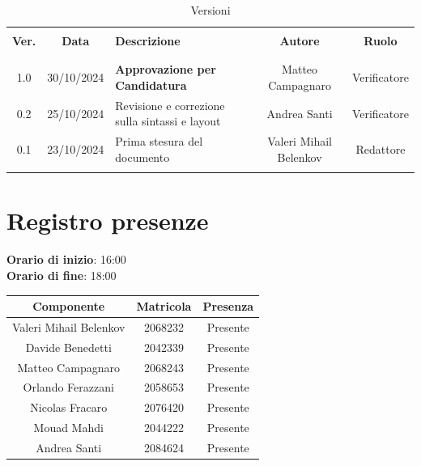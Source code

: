 \documentclass[italian, 12pt]{article}
\begin{document}
\pagestyle{mystyle}


\begin{table}[!h]
	\caption{Versioni}
	\begin{center}
        \fontsize{11.9}{13}\selectfont
		\begin{tabular}{ c c m{6cm} c c}
			\hline \\[-2ex]
			\textbf{Ver.} & \textbf{Data} & \textbf{Descrizione} & \textbf{Autore} & \textbf{Ruolo}  \\
			\\[-2ex] \hline \\[-1.5ex]
            1.0 & 30/10/2024 & \textbf{Approvazione per Candidatura} & Matteo Campagnaro & Verificatore\\
            0.2 & 25/10/2024 & Revisione e correzione sulla sintassi e layout & Andrea Santi & Verificatore\\
			0.1 & 23/10/2024 & Prima stesura del documento & Valeri Mihail Belenkov & Redattore\\
			\\[-1.5ex] \hline
		\end{tabular}
	\end{center}
\end{table}


\tableofcontents
\newpage


\section{Registro presenze}

\textbf{Orario di inizio}: 16:00\\
\textbf{Orario di fine}: 18:00\\


\begin{flushleft}
	\begin{table}[!h]
	\begin{tabular}{ |c|c|c| } 
		\hline
		\textbf{Componente} & \textbf{Matricola} & \textbf{Presenza} \\
  \hline 
		Valeri Mihail Belenkov & 2068232 & Presente \\
		Davide Benedetti 	& 2042339 & Presente \\
		Matteo Campagnaro	& 2068243 & Presente \\
		Orlando Ferazzani 	& 2058653 & Presente \\
		Nicolas Fracaro 	& 2076420 & Presente \\
		Mouad Mahdi		    & 2044222 & Presente \\ 
		Andrea Santi 	    & 2084624 & Presente \\
		\hline
	\end{tabular}
	\end{table}
	\end{flushleft}
\end{document}
